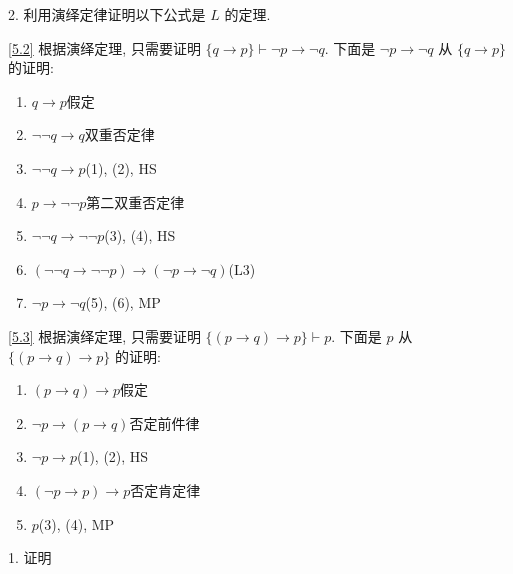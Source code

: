 \documentclass[boxes]{homework}
\begin{document}
\begin{problem}
    2. 利用演绎定律证明以下公式是 $L$ 的定理.
\end{problem}
\begin{solution}
    \ref{5.2}
    根据演绎定理, 只需要证明 $\{q\to p\}\vdash \lnot p\to \lnot q$. 下面是 $\lnot p\to \lnot q$ 从 $\{q\to p\}$ 的证明:
    \begin{enumerate}[label = (\arabic*)]
        \item $q\to p$\hfill 假定
        \item $\lnot \lnot q\to q$\hfill 双重否定律
        \item $\lnot \lnot q\to p$\hfill (1), (2), HS
        \item $p\to \lnot \lnot p$\hfill 第二双重否定律
        \item $\lnot \lnot q\to \lnot \lnot p$\hfill (3), (4), HS
        \item $(\lnot \lnot q\to \lnot \lnot p)\to(\lnot p\to \lnot q)$\hfill (L3)
        \item $\lnot p\to \lnot q$\hfill (5), (6), MP
    \end{enumerate}
    \ref{5.3}
    根据演绎定理, 只需要证明 $\{(p\to q)\to p\}\vdash p$.
    下面是 $p$ 从 $\{(p\to q)\to p\}$ 的证明:
    \begin{enumerate}[label = (\arabic*)]
        \item $(p\to q)\to p$\hfill 假定
        \item $\lnot p\to (p\to q)$\hfill 否定前件律
        \item $\lnot p\to p$\hfill (1), (2), HS
        \item $(\lnot p\to p)\to p$\hfill 否定肯定律
        \item $p$\hfill (3), (4), MP
    \end{enumerate}
\end{solution}
\begin{problem}
    1. 证明
\end{problem}
\end{document}
